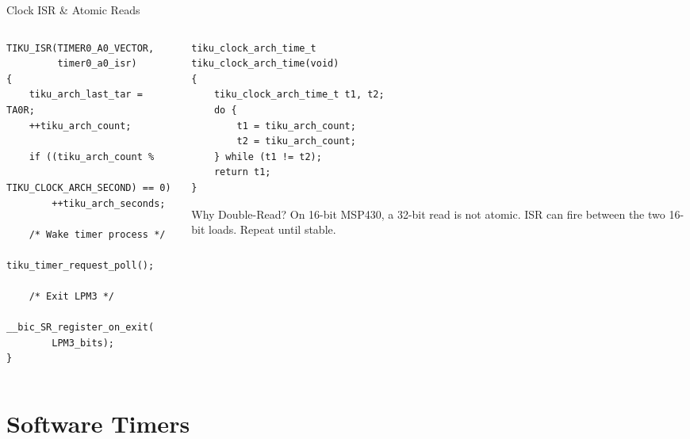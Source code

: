 \documentclass[aspectratio=169, 10pt]{beamer}
\begin{document}
\begin{frame}[fragile]{Clock ISR \& Atomic Reads}
\begin{columns}[T]
\begin{column}{0.48\textwidth}
\begin{lstlisting}[style=cstyle, title={Timer A0 ISR (simplified)}]
TIKU_ISR(TIMER0_A0_VECTOR,
         timer0_a0_isr)
{
    tiku_arch_last_tar = TA0R;
    ++tiku_arch_count;

    if ((tiku_arch_count %
         TIKU_CLOCK_ARCH_SECOND) == 0)
        ++tiku_arch_seconds;

    /* Wake timer process */
    tiku_timer_request_poll();

    /* Exit LPM3 */
    __bic_SR_register_on_exit(
        LPM3_bits);
}
\end{lstlisting}
\end{column}

\begin{column}{0.48\textwidth}
\begin{lstlisting}[style=cstyle, title={Double-read for stability}]
tiku_clock_arch_time_t
tiku_clock_arch_time(void)
{
    tiku_clock_arch_time_t t1, t2;
    do {
        t1 = tiku_arch_count;
        t2 = tiku_arch_count;
    } while (t1 != t2);
    return t1;
}
\end{lstlisting}

\vspace{0.3em}
\begin{block}{Why Double-Read?}
On 16-bit MSP430, a 32-bit read
is not atomic. ISR can fire between
the two 16-bit loads.
Repeat until stable.
\end{block}
\end{column}
\end{columns}
\end{frame}

\section{Software Timers}
\end{document}
